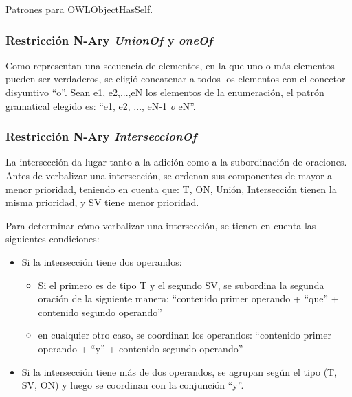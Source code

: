 \begin{GrammarEnv}
\begin{grammar}
\end{grammar}
\caption{Patrones para OWLObjectHasSelf.}\label{gram:hasself_rest}
\end{GrammarEnv}


\subsubsection{Restricción N-Ary \emph{UnionOf} y \emph{oneOf}} 
Como representan una secuencia de elementos, en la que uno o más elementos pueden ser verdaderos, se eligió concatenar a todos los elementos con el conector disyuntivo ``o''. Sean e1, e2,...,eN los elementos de la enumeración, el patrón gramatical elegido es: ``e1, e2, ..., eN-1 \emph{o} eN''.

\subsubsection{Restricción N-Ary \emph{InterseccionOf}}
La intersección da lugar tanto a la adición como a la subordinación de oraciones. Antes de verbalizar una intersección, se ordenan sus componentes de mayor a menor prioridad, teniendo en cuenta que: T, ON, Unión, Intersección tienen la misma prioridad, y SV tiene menor prioridad. 

Para determinar cómo verbalizar una intersección, se tienen en cuenta las siguientes condiciones:
\begin{itemize}
    \item Si la intersección tiene dos operandos:
        \begin{itemize}
            \item Si el primero es de tipo T  y el segundo SV, se subordina la segunda oración de la siguiente manera:
            ``contenido primer operando + ``que'' + contenido segundo operando''
            \item en cualquier otro caso, se coordinan los operandos:
            ``contenido primer operando + ``y'' + contenido segundo operando''
        \end{itemize}
        \item Si la intersección tiene más de dos operandos, se agrupan según el tipo  (T, SV, ON) y luego se coordinan con la conjunción ``y''.
\end{itemize}

